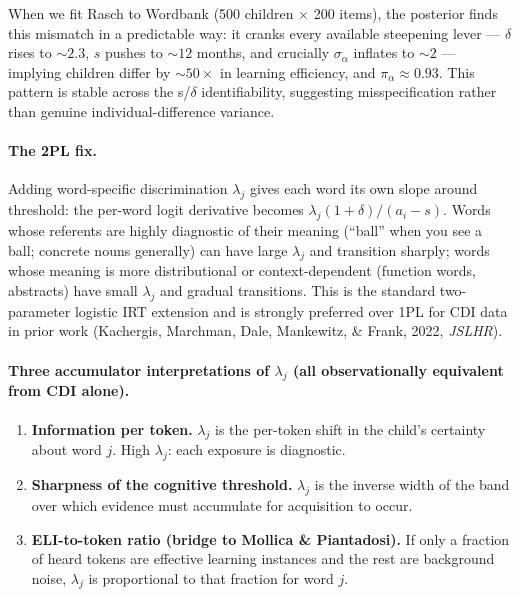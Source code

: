 \documentclass[11pt]{article}
\begin{document}
When we fit Rasch to Wordbank (500 children \(\times\) 200 items), the
posterior finds this mismatch in a predictable way: it cranks every
available steepening lever — \(\delta\) rises to \(\sim 2.3\), \(s\)
pushes to \(\sim 12\) months, and crucially \(\sigma_\alpha\) inflates
to \(\sim 2\) — implying children differ by \(\sim 50\times\) in
learning efficiency, and \(\pi_\alpha \approx 0.93\). This pattern is
stable across the s/\(\delta\) identifiability, suggesting misspecification
rather than genuine individual-difference variance.

\paragraph{The 2PL fix.} Adding word-specific discrimination
\(\lambda_j\) gives each word its own slope around threshold: the
per-word logit derivative becomes \(\lambda_j(1+\delta)/(a_i - s)\).
Words whose referents are highly diagnostic of their meaning (``ball''
when you see a ball; concrete nouns generally) can have large
\(\lambda_j\) and transition sharply; words whose meaning is more
distributional or context-dependent (function words, abstracts) have
small \(\lambda_j\) and gradual transitions. This is the standard
two-parameter logistic IRT extension and is strongly preferred over
1PL for CDI data in prior work (Kachergis, Marchman, Dale, Mankewitz,
\& Frank, 2022, \emph{JSLHR}).

\paragraph{Three accumulator interpretations of \(\lambda_j\) (all
observationally equivalent from CDI alone).}
\begin{enumerate}[leftmargin=1.3em]
\item \textbf{Information per token.} \(\lambda_j\) is the per-token
shift in the child's certainty about word \(j\). High \(\lambda_j\):
each exposure is diagnostic.
\item \textbf{Sharpness of the cognitive threshold.} \(\lambda_j\) is
the inverse width of the band over which evidence must accumulate for
acquisition to occur.
\item \textbf{ELI-to-token ratio (bridge to Mollica \& Piantadosi).} If
only a fraction of heard tokens are effective learning instances and the
rest are background noise, \(\lambda_j\) is proportional to that
fraction for word \(j\).
\end{enumerate}
\end{document}
